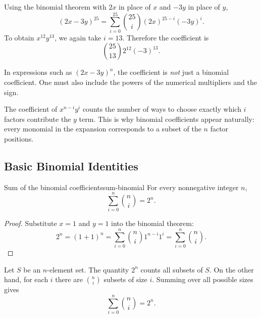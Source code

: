 \begin{examplebox}[title={Coefficient of $x^{12}y^{13}$ in $(2x-3y)^{25}$}]
Using the binomial theorem with $2x$ in place of $x$ and $-3y$ in place of $y$,
\[
(2x-3y)^{25}
=
\sum_{i=0}^{25}\binom{25}{i}(2x)^{25-i}(-3y)^i.
\]
To obtain $x^{12}y^{13}$, we again take $i=13$. Therefore the coefficient is
\[
\binom{25}{13}2^{12}(-3)^{13}.
\]
\end{examplebox}

\begin{commonmistake}[title={Coefficient questions with scaled variables}]
In expressions such as $(2x-3y)^n$, the coefficient is \emph{not} just a binomial coefficient. One must also include the powers of the numerical multipliers and the sign.
\end{commonmistake}

\begin{extension}[title={Why the coefficient is a combination}]
The coefficient of $x^{n-i}y^i$ counts the number of ways to choose exactly which $i$ factors contribute the $y$ term. This is why binomial coefficients appear naturally: every monomial in the expansion corresponds to a subset of the $n$ factor positions.
\end{extension}

\subsection{Basic Binomial Identities}

\begin{theorem}{Sum of the binomial coefficients}{sum-binomial}
For every nonnegative integer $n$,
\[
\sum_{i=0}^{n}\binom{n}{i}=2^n.
\]
\end{theorem}

\begin{proof}
Substitute $x=1$ and $y=1$ into the binomial theorem:
\[
2^n=(1+1)^n=\sum_{i=0}^{n}\binom{n}{i}1^{n-i}1^i=\sum_{i=0}^{n}\binom{n}{i}.
\]
\end{proof}

\begin{examplebox}[title={Combinatorial meaning of $\sum_{i=0}^{n}\binom{n}{i}=2^n$}]
Let $S$ be an $n$-element set. The quantity $2^n$ counts all subsets of $S$. On the other hand, for each $i$ there are $\binom{n}{i}$ subsets of size $i$. Summing over all possible sizes gives
\[
\sum_{i=0}^{n}\binom{n}{i}=2^n.
\]
\end{examplebox}

